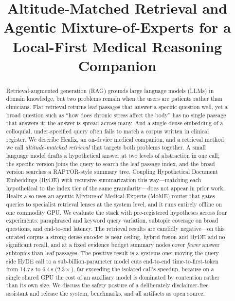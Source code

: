 \documentclass[conference]{IEEEtran}
\begin{document}
\title{Altitude-Matched Retrieval and Agentic Mixture-of-Experts for a
Local-First Medical Reasoning Companion}

\author{
}

\maketitle

\begin{abstract}
Retrieval-augmented generation (RAG) grounds large language models (LLMs) in
domain knowledge, but two problems remain when the users are patients rather than
clinicians. Flat retrieval returns leaf passages that answer a specific question
well, yet a broad question such as ``how does chronic stress affect the body''
has no single passage that answers it; the answer is spread across many. And a
single dense embedding of a colloquial, under-specified query often fails to
match a corpus written in clinical register. We describe Healix, an on-device
medical companion, and a retrieval method we call \emph{altitude-matched
retrieval} that targets both problems together. A small language model drafts a
hypothetical answer at two levels of abstraction in one call; the specific
version joins the query to search the leaf passage index, and the broad version
searches a RAPTOR-style summary tree. Coupling Hypothetical Document Embeddings
(HyDE) with recursive summarization this way---matching each hypothetical to the
index tier of the same granularity---does not appear in prior work. Healix also
uses an agentic Mixture-of-Medical-Experts (MoME) router that gates queries to
specialist retrieval lenses at the system level, and it runs entirely offline on
one commodity GPU. We evaluate the stack with pre-registered hypotheses across four experiments:
paraphrased and keyword query variation, subtopic coverage on broad questions,
and end-to-end latency. The retrieval results are candidly negative---on this
curated corpus a strong dense encoder is near ceiling, hybrid fusion and HyDE add
no significant recall, and at a fixed evidence budget summary nodes cover
\emph{fewer} answer subtopics than leaf passages. The positive result is a
systems one: moving the query-side HyDE call to a sub-billion-parameter model
cuts end-to-end time-to-first-token from 14.7\,s to 6.4\,s ($2.3\times$), far
exceeding the isolated call's speedup, because on a single shared GPU the cost of
an auxiliary model is dominated by contention rather than its own size. We
discuss the safety posture of a deliberately disclaimer-free assistant and
release the system, benchmarks, and all artifacts as open source.
\end{abstract}
\end{document}
